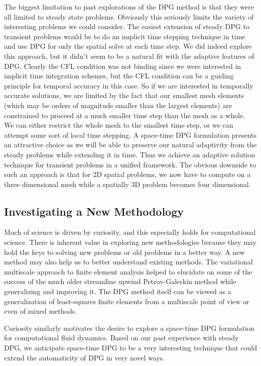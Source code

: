 \documentclass[Proposal.tex]{subfiles}
\begin{document}
The biggest limitation to past explorations of the DPG method is that they were all limited to steady state problems.
Obviously this seriously limits the variety of interesting problems we could consider. 
The easiest extension of steady DPG to transient problems would be to do an implicit time stepping technique in time and use DPG for only the spatial solve at each time step.
We did indeed explore this approach, but it didn't seem to be a natural fit with the adaptive features of DPG.
Clearly the CFL condition was not binding since we were interested in implicit time integration schemes, but the CFL condition can be a guiding principle for temporal accuracy in this case.
So if we are interested in temporally accurate solutions, we are limited by the fact that our smallest mesh elements (which may be orders of magnitude smaller than the largest elements) are constrained to proceed at a much smaller time step than the mesh as a whole. 
We can either restrict the whole mesh to the smallest time step, or we can attempt some sort of local time stepping.
A space-time DPG formulation presents an attractive choice as we will be able to preserve our natural adaptivity from the steady problems while extending it in time.
Thus we achieve an adaptive solution technique for transient problems in a unified framework.
The obvious downside to such an approach is that for 2D spatial problems, we now have to compute on a three dimensional mesh while a spatially 3D problem becomes four dimensional.

\subsection{Investigating a New Methodology}
Much of science is driven by curiosity, and this especially holds for computational science. 
There is inherent value in exploring new methodologies because they may hold the keys to solving new problems or old problems in a better way.
A new method may also help us to better understand existing methods. 
The variational multiscale approach to finite element analysis helped to elucidate on some of the success of the much older streamline upwind Petrov-Galerkin method while generalizing and improving it.
The DPG method itself can be viewed as a generalization of least-squares finite elements 
from a multiscale point of view\cite{DPGMultiscale} or even of mixed methods\cite{DPGMixed}. 

Curiosity similarly motivates the desire to explore a space-time DPG formulation for computational fluid dynamics. 
Based on our past experience with steady DPG, we anticipate space-time DPG to be a very interesting technique that could extend the automaticity of DPG in very novel ways.
\end{document}
